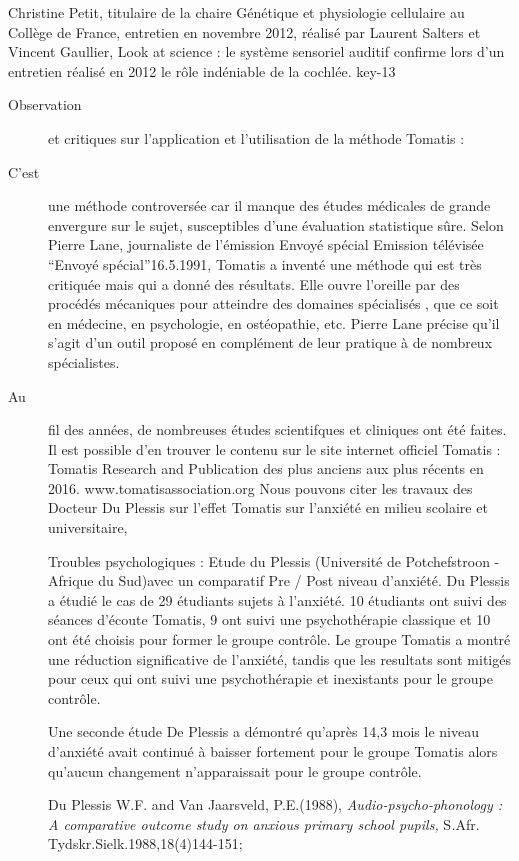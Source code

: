 \documentclass[12pt,french]{report}
\makeatletter
\let\SF@@footnote\footnote
\def\footnote{\ifx\protect\@typeset@protect
    \expandafter\SF@@footnote
  \else
    \expandafter\SF@gobble@opt
  \fi
}
\edef\SF@gobble@opt{\noexpand\protect
  \expandafter\noexpand\csname SF@gobble@opt \endcsname}
\makeatother
\begin{document}
\footnote{ Christine Petit, titulaire de la chaire Génétique et physiologie
cellulaire au Collège de France, entretien en novembre 2012, réalisé
par Laurent Salters et Vincent Gaullier, Look at science : le système
sensoriel auditif confirme lors d'un entretien réalisé en 2012 le
rôle indéniable de la cochlée. key-13}
\begin{description}
\item [{Observation}] et critiques sur l'application et l'utilisation de
la méthode Tomatis : 
\item [{C'est}] une méthode controversée car il manque des études médicales
de grande envergure sur le sujet, susceptibles d'une évaluation statistique
sûre. Selon Pierre Lane, journaliste de l'émission Envoyé spécial
\footnote{Emission télévisée ``Envoyé spécial''16.5.1991}, Tomatis
a inventé une méthode qui est très critiquée mais qui a donné des
résultats. Elle ouvre l'oreille par des procédés mécaniques pour atteindre
des domaines spécialisés , que ce soit en médecine, en psychologie,
en ostéopathie, etc. Pierre Lane précise qu'il s'agit d'un outil proposé
en complément de leur pratique à de nombreux spécialistes. 
\item [{Au}] fil des années, de nombreuses études scientifques et cliniques
ont été faites. Il est possible d'en trouver le contenu sur le site
internet officiel Tomatis : Tomatis Research and Publication des plus
anciens aux plus récents en 2016.\footnote{www.tomatisassociation.org}
Nous pouvons citer les travaux des Docteur Du Plessis sur l'effet
Tomatis sur l'anxiété en milieu scolaire et universitaire,\footnote{Troubles psychologiques : Etude du Plessis (Université de Potchefstroon
- Afrique du Sud)avec un comparatif Pre / Post niveau d\textquoteright anxiété.
Du Plessis a étudié le cas de 29 étudiants sujets à l\textquoteright anxiété.
10 étudiants ont suivi des séances d\textquoteright écoute Tomatis\textregistered ,
9 ont suivi une psychothérapie classique et 10 ont été choisis pour
former le groupe contrôle. Le groupe Tomatis\textregistered{} a montré
une réduction significative de l\textquoteright anxiété, tandis que
les resultats sont mitigés pour ceux qui ont suivi une psychothérapie
et inexistants pour le groupe contrôle.

Une seconde étude De Plessis a démontré qu\textquoteright après 14,3
mois le niveau d\textquoteright anxiété avait continué à baisser fortement
pour le groupe Tomatis\textregistered{} alors qu\textquoteright aucun
changement n\textquoteright apparaissait pour le groupe contrôle.} \footnote{Du Plessis W.F. and Van Jaarsveld, P.E.(1988), \emph{Audio-psycho-phonology
: A comparative outcome study on anxious primary school pupils, }S\emph{.}Afr.
Tydskr.Sielk.1988,18(4)144-151;

}
\end{description}
\end{document}
